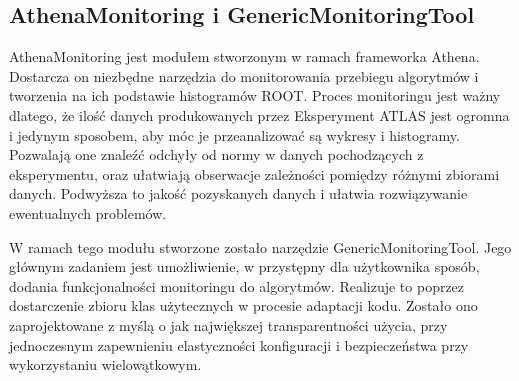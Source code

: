 \subsection{AthenaMonitoring i GenericMonitoringTool}
AthenaMonitoring jest modułem stworzonym w ramach frameworka Athena.
Dostarcza on niezbędne narzędzia do monitorowania przebiegu algorytmów i tworzenia na ich podstawie histogramów ROOT.
Proces monitoringu jest ważny dlatego, że ilość danych produkowanych przez Eksperyment ATLAS jest ogromna i jedynym sposobem, aby móc je przeanalizować są wykresy i histogramy.
Pozwalają one znaleźć odchyły od normy w danych pochodzących z eksperymentu, oraz ułatwiają obserwacje zależności pomiędzy różnymi zbiorami danych.
Podwyższa to jakość pozyskanych danych i ułatwia rozwiązywanie ewentualnych problemów.

W ramach tego modułu stworzone zostało narzędzie GenericMonitoringTool. 
Jego głównym zadaniem jest umożliwienie, w przystępny dla użytkownika sposób, dodania funkcjonalności monitoringu do algorytmów.
Realizuje to poprzez dostarczenie zbioru klas użytecznych w procesie adaptacji kodu. 
Zostało ono zaprojektowane z myślą o jak największej transparentności użycia, przy jednoczesnym zapewnieniu elastyczności konfiguracji i bezpieczeństwa przy wykorzystaniu wielowątkowym.